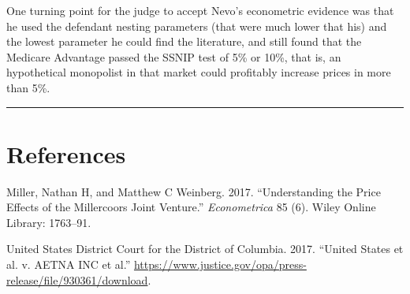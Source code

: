 \documentclass[]{article}
\begin{document}
One turning point for the judge to accept Nevo's econometric evidence
was that he used the defendant nesting parameters (that were much lower
that his) and the lowest parameter he could find the literature, and
still found that the Medicare Advantage passed the SSNIP test of 5\% or
10\%, that is, an hypothetical monopolist in that market could
profitably increase prices in more than 5\%.

\begin{center}\rule{0.5\linewidth}{\linethickness}\end{center}

\hypertarget{references}{%
\section*{References}\label{references}}

\hypertarget{refs}{}
\leavevmode\hypertarget{ref-miller2017}{}%
Miller, Nathan H, and Matthew C Weinberg. 2017. ``Understanding the
Price Effects of the Millercoors Joint Venture.'' \emph{Econometrica} 85
(6). Wiley Online Library: 1763--91.

\leavevmode\hypertarget{ref-aetna}{}%
United States District Court for the District of Columbia. 2017.
``United States et al. v. AETNA INC et al.''
\url{https://www.justice.gov/opa/press-release/file/930361/download}.
\end{document}
